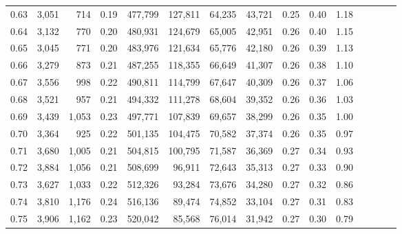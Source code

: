 \begin{tabular}{rrrcrrrrrrrrrrr}
0.63 &   3,051 &     714 &                                       0.19 &  477,799 &  127,811 &   64,235 &   43,721 &  0.25 &  0.40 &                         1.18 \\
0.64 &   3,132 &     770 &                                       0.20 &  480,931 &  124,679 &   65,005 &   42,951 &  0.26 &  0.40 &                         1.15 \\
0.65 &   3,045 &     771 &                                       0.20 &  483,976 &  121,634 &   65,776 &   42,180 &  0.26 &  0.39 &                         1.13 \\
0.66 &   3,279 &     873 &                                       0.21 &  487,255 &  118,355 &   66,649 &   41,307 &  0.26 &  0.38 &                         1.10 \\
0.67 &   3,556 &     998 &                                       0.22 &  490,811 &  114,799 &   67,647 &   40,309 &  0.26 &  0.37 &                         1.06 \\
0.68 &   3,521 &     957 &                                       0.21 &  494,332 &  111,278 &   68,604 &   39,352 &  0.26 &  0.36 &                         1.03 \\
0.69 &   3,439 &   1,053 &                                       0.23 &  497,771 &  107,839 &   69,657 &   38,299 &  0.26 &  0.35 &                         1.00 \\
0.70 &   3,364 &     925 &                                       0.22 &  501,135 &  104,475 &   70,582 &   37,374 &  0.26 &  0.35 &                         0.97 \\
0.71 &   3,680 &   1,005 &                                       0.21 &  504,815 &  100,795 &   71,587 &   36,369 &  0.27 &  0.34 &                         0.93 \\
0.72 &   3,884 &   1,056 &                                       0.21 &  508,699 &   96,911 &   72,643 &   35,313 &  0.27 &  0.33 &                         0.90 \\
0.73 &   3,627 &   1,033 &                                       0.22 &  512,326 &   93,284 &   73,676 &   34,280 &  0.27 &  0.32 &                         0.86 \\
0.74 &   3,810 &   1,176 &                                       0.24 &  516,136 &   89,474 &   74,852 &   33,104 &  0.27 &  0.31 &                         0.83 \\
0.75 &   3,906 &   1,162 &                                       0.23 &  520,042 &   85,568 &   76,014 &   31,942 &  0.27 &  0.30 &                         0.79 \\

\end{tabular}

